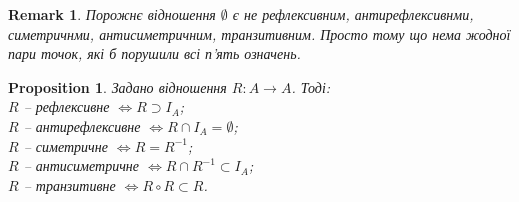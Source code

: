 \documentclass[a4paper, 14pt]{extarticle}
\theoremstyle{theoremdd}
\theoremstyle{theoremdd}
\theoremstyle{theoremdd}
\theoremstyle{theoremdd}
\theoremstyle{theoremdd}
\theoremstyle{theoremdd}
\theoremstyle{theoremdd}
\theoremstyle{theoremdd}
\theoremstyle{theoremdd}
\newtheorem{proposition}[theorem]{Proposition}
\theoremstyle{theoremdd}
\theoremstyle{theoremdd}
\newtheorem{remark}[theorem]{Remark}
\theoremstyle{theoremdd}
\theoremstyle{theoremdd}
\theoremstyle{theoremdd}
\theoremstyle{theoremdd}
\begin{document}
\begin{remark}
Порожнє відношення $\emptyset$ є не рефлексивним, антирефлексивнми, симетричнми, антисиметричним, транзитивним. Просто тому що нема жодної пари точок, які б порушили всі п'ять означень.
\end{remark}

\begin{proposition}
Задано відношення $R \colon A \to A$. Тоді:\\
$R$ -- рефлексивне $\iff R \supset I_A$;\\
$R$ -- антирефлексивне $\iff R \cap I_A = \emptyset$;\\
$R$ -- симетричне $\iff R = R^{-1}$;\\
$R$ -- антисиметричне $\iff R \cap R^{-1} \subset I_A$;\\
$R$ -- транзитивне $\iff R \circ R \subset R$.
\end{proposition}
\end{document}
